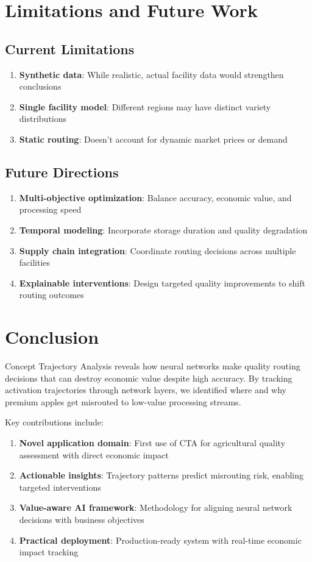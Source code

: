 \documentclass[11pt,a4paper]{article}
\begin{document}
\section{Limitations and Future Work}

\subsection{Current Limitations}

\begin{enumerate}
    \item \textbf{Synthetic data}: While realistic, actual facility data would strengthen conclusions
    \item \textbf{Single facility model}: Different regions may have distinct variety distributions
    \item \textbf{Static routing}: Doesn't account for dynamic market prices or demand
\end{enumerate}

\subsection{Future Directions}

\begin{enumerate}
    \item \textbf{Multi-objective optimization}: Balance accuracy, economic value, and processing speed
    \item \textbf{Temporal modeling}: Incorporate storage duration and quality degradation
    \item \textbf{Supply chain integration}: Coordinate routing decisions across multiple facilities
    \item \textbf{Explainable interventions}: Design targeted quality improvements to shift routing outcomes
\end{enumerate}

\section{Conclusion}

Concept Trajectory Analysis reveals how neural networks make quality routing decisions that can destroy economic value despite high accuracy. By tracking activation trajectories through network layers, we identified where and why premium apples get misrouted to low-value processing streams.

Key contributions include:
\begin{enumerate}
    \item \textbf{Novel application domain}: First use of CTA for agricultural quality assessment with direct economic impact
    \item \textbf{Actionable insights}: Trajectory patterns predict misrouting risk, enabling targeted interventions
    \item \textbf{Value-aware AI framework}: Methodology for aligning neural network decisions with business objectives
    \item \textbf{Practical deployment}: Production-ready system with real-time economic impact tracking
\end{enumerate}
\end{document}

